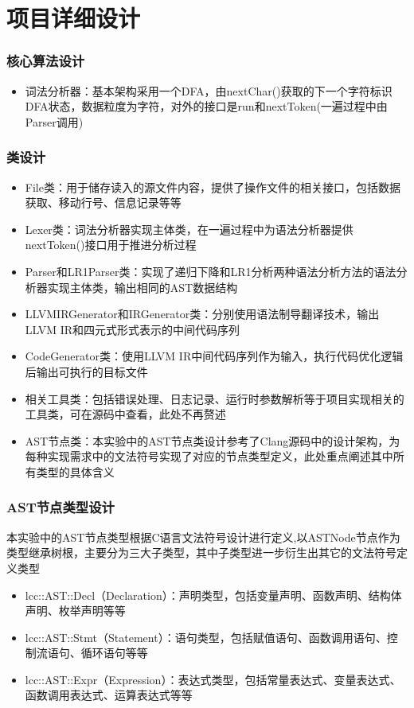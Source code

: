 \section{项目详细设计}
\begin{frame}
    \frametitle{核心算法设计}
    \footnotesize
    \begin{itemize}
        \item {词法分析器：基本架构采用一个DFA，由nextChar()获取的下一个字符标识DFA状态，数据粒度为字符，对外的接口是run和nextToken(一遍过程中由Parser调用)}
    \end{itemize}
\end{frame}

\begin{frame}
    \frametitle{类设计}
    \footnotesize
    \begin{itemize}
        \item {File类：用于储存读入的源文件内容，提供了操作文件的相关接口，包括数据获取、移动行号、信息记录等等}
        \item {Lexer类：词法分析器实现主体类，在一遍过程中为语法分析器提供nextToken()接口用于推进分析过程}
        \item {Parser和LR1Parser类：实现了递归下降和LR1分析两种语法分析方法的语法分析器实现主体类，输出相同的AST数据结构}
        \item {LLVMIRGenerator和IRGenerator类：分别使用语法制导翻译技术，输出LLVM IR和四元式形式表示的中间代码序列}
        \item {CodeGenerator类：使用LLVM IR中间代码序列作为输入，执行代码优化逻辑后输出可执行的目标文件}
        \item {相关工具类：包括错误处理、日志记录、运行时参数解析等于项目实现相关的工具类，可在源码中查看，此处不再赘述}
        \item {AST节点类：本实验中的AST节点类设计参考了Clang源码中的设计架构，为每种实现需求中的文法符号实现了对应的节点类型定义，此处重点阐述其中所有类型的具体含义}
    \end{itemize}
\end{frame}

\begin{frame}
    \frametitle{AST节点类型设计}
    \footnotesize
    {本实验中的AST节点类型根据C语言文法符号设计进行定义,以ASTNode节点作为类型继承树根，主要分为三大子类型，其中子类型进一步衍生出其它的文法符号定义类型}
    \begin{itemize}
        \item {lcc::AST::Decl（Declaration）：声明类型，包括变量声明、函数声明、结构体声明、枚举声明等等}
        \item {lcc::AST::Stmt（Statement）：语句类型，包括赋值语句、函数调用语句、控制流语句、循环语句等等}
        \item {lcc::AST::Expr（Expression）：表达式类型，包括常量表达式、变量表达式、函数调用表达式、运算表达式等等}
    \end{itemize}
\end{frame}

